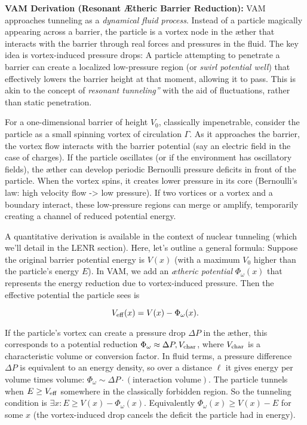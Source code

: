 \documentclass[a4paper, aps,preprint,superscriptaddress, 12pt]{revtex4}
\begin{document}
\textbf{VAM Derivation (Resonant Ætheric Barrier Reduction):} VAM approaches tunneling as a \textit{dynamical fluid process}. Instead of a particle magically appearing across a barrier, the particle is a vortex node in the æther that interacts with the barrier through real forces and pressures in the fluid. The key idea is vortex-induced pressure drops: A particle attempting to penetrate a barrier can create a localized low-pressure region (or \textit{swirl potential well}) that effectively lowers the barrier height at that moment, allowing it to pass. This is akin to the concept of \textit{\grqq resonant tunneling\textquotedblright} with the aid of fluctuations, rather than static penetration.


For a one-dimensional barrier of height $V_0$, classically impenetrable, consider the particle as a small spinning vortex of circulation $\Gamma$. As it approaches the barrier, the vortex flow interacts with the barrier potential (say an electric field in the case of charges). If the particle oscillates (or if the environment has oscillatory fields), the æther can develop periodic Bernoulli pressure deficits in front of the particle. When the vortex spins, it creates lower pressure in its core (Bernoulli's law: high velocity flow -> low pressure). If two vortices or a vortex and a boundary interact, these low-pressure regions can merge or amplify, temporarily creating a channel of reduced potential energy.


A quantitative derivation is available in the context of nuclear tunneling (which we'll detail in the LENR section). Here, let's outline a general formula: Suppose the original barrier potential energy is $V(x)$ (with a maximum $V_0$ higher than the particle's energy $E$). In VAM, we add an \textit{ætheric potential} $\Phi_\omega(x)$ that represents the energy reduction due to vortex-induced pressure. Then the effective potential the particle sees is

\begin{equation}
    V_{\rm eff}(x) = V(x) - \Phi_\omega(x).
\end{equation}

If the particle's vortex can create a pressure drop $\Delta P$ in the æther, this corresponds to a potential reduction $\Phi_\omega \approx \Delta P , V_{\rm char}$, where $V_{\rm char}$ is a characteristic volume or conversion factor. In fluid terms, a pressure difference $\Delta P$ is equivalent to an energy density, so over a distance $\ell$ it gives energy per volume times volume: $ \Phi_\omega \sim \Delta P \cdot (\text{interaction volume})$. The particle tunnels when $E \ge V_{\rm eff}$ somewhere in the classically forbidden region. So the tunneling condition is $\exists x: E \ge V(x) - \Phi_\omega(x)$. Equivalently $\Phi_\omega(x) \ge V(x) - E$ for some $x$ (the vortex-induced drop cancels the deficit the particle had in energy).
\end{document}
